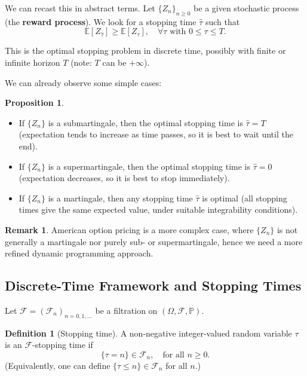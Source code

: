 \documentclass[12pt,a4paper]{article}
\theoremstyle{definition}
\newtheorem{definition}{Definition}[section]
\newtheorem{proposition}{Proposition}[section]
\newtheorem{remark}{Remark}[section]
\begin{document}
We can recast this in abstract terms. Let $\{Z_n\}_{n \geq 0}$ be a given stochastic process (the \textbf{reward process}). We look for a stopping time $\widehat{\tau}$ such that
\[
\mathbb{E}[Z_{\widehat{\tau}}] \geq \mathbb{E}[Z_\tau], \quad \forall \tau \text{ with } 0 \leq \tau \leq T.
\]

This is the optimal stopping problem in discrete time, possibly with finite or infinite horizon $T$ (note: $T$ can be $+\infty$).

We can already observe some simple cases:

\begin{proposition} \\
\begin{itemize}
\item If $\{Z_n\}$ is a submartingale, then the optimal stopping time is $\widehat{\tau} = T$ (expectation tends to increase as time passes, so it is best to wait until the end).
\item If $\{Z_n\}$ is a supermartingale, then the optimal stopping time is $\widehat{\tau} = 0$ (expectation decreases, so it is best to stop immediately).
\item If $\{Z_n\}$ is a martingale, then any stopping time $\widehat{\tau}$ is optimal (all stopping times give the same expected value, under suitable integrability conditions).
\end{itemize}
\end{proposition}

\begin{remark}
American option pricing is a more complex case, where $\{Z_n\}$ is not generally a martingale nor purely sub- or supermartingale, hence we need a more refined dynamic programming approach.
\end{remark}

\subsection{Discrete-Time Framework and Stopping Times}

Let $\mathcal{F} = (\mathcal{F}_n)_{n = 0,1,\ldots}$ be a filtration on $(\Omega, \mathcal{F}, \mathbb{P})$.

\begin{definition}[Stopping time]
A non-negative integer-valued random variable $\tau$ is an $\mathcal{F}$-stopping time if
\[
\{\tau = n\} \in \mathcal{F}_n, \quad \text{for all } n \geq 0.
\]
(Equivalently, one can define $\{\tau \leq n\} \in \mathcal{F}_n$ for all $n$.)
\end{definition}
\end{document}
